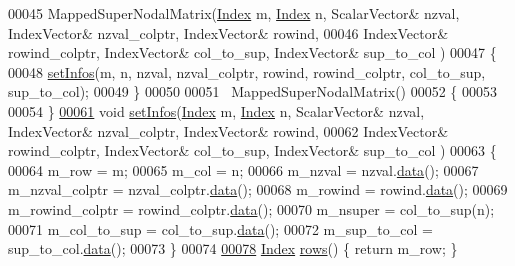 \begin{DoxyCode}
00045     MappedSuperNodalMatrix(\hyperlink{namespace_eigen_a62e77e0933482dafde8fe197d9a2cfde}{Index} m, \hyperlink{namespace_eigen_a62e77e0933482dafde8fe197d9a2cfde}{Index} n,  ScalarVector& nzval, IndexVector& nzval\_colptr, 
      IndexVector& rowind,
00046              IndexVector& rowind\_colptr, IndexVector& col\_to\_sup, IndexVector& sup\_to\_col )
00047     \{
00048       \hyperlink{group___sparse_l_u___module_af1427486564e2c75b9da68f98bd04e63}{setInfos}(m, n, nzval, nzval\_colptr, rowind, rowind\_colptr, col\_to\_sup, sup\_to\_col);
00049     \}
00050     
00051     ~MappedSuperNodalMatrix()
00052     \{
00053       
00054     \}
\hyperlink{group___sparse_l_u___module_af1427486564e2c75b9da68f98bd04e63}{00061}     \textcolor{keywordtype}{void} \hyperlink{group___sparse_l_u___module_af1427486564e2c75b9da68f98bd04e63}{setInfos}(\hyperlink{namespace_eigen_a62e77e0933482dafde8fe197d9a2cfde}{Index} m, \hyperlink{namespace_eigen_a62e77e0933482dafde8fe197d9a2cfde}{Index} n, ScalarVector& nzval, IndexVector& nzval\_colptr, 
      IndexVector& rowind,
00062              IndexVector& rowind\_colptr, IndexVector& col\_to\_sup, IndexVector& sup\_to\_col )
00063     \{
00064       m\_row = m;
00065       m\_col = n; 
00066       m\_nzval = nzval.\hyperlink{class_eigen_1_1_plain_object_base_ac25699535374b1854cf8494e44ad31b2}{data}(); 
00067       m\_nzval\_colptr = nzval\_colptr.\hyperlink{class_eigen_1_1_plain_object_base_ac25699535374b1854cf8494e44ad31b2}{data}(); 
00068       m\_rowind = rowind.\hyperlink{class_eigen_1_1_plain_object_base_ac25699535374b1854cf8494e44ad31b2}{data}(); 
00069       m\_rowind\_colptr = rowind\_colptr.\hyperlink{class_eigen_1_1_plain_object_base_ac25699535374b1854cf8494e44ad31b2}{data}(); 
00070       m\_nsuper = col\_to\_sup(n); 
00071       m\_col\_to\_sup = col\_to\_sup.\hyperlink{class_eigen_1_1_plain_object_base_ac25699535374b1854cf8494e44ad31b2}{data}(); 
00072       m\_sup\_to\_col = sup\_to\_col.\hyperlink{class_eigen_1_1_plain_object_base_ac25699535374b1854cf8494e44ad31b2}{data}(); 
00073     \}
00074     
\hyperlink{group___sparse_l_u___module_a5cc8f3887a09bd7d078a6744c158b5a0}{00078}     \hyperlink{namespace_eigen_a62e77e0933482dafde8fe197d9a2cfde}{Index} \hyperlink{group___sparse_l_u___module_a5cc8f3887a09bd7d078a6744c158b5a0}{rows}() \{ \textcolor{keywordflow}{return} m\_row; \}

\end{DoxyCode}
